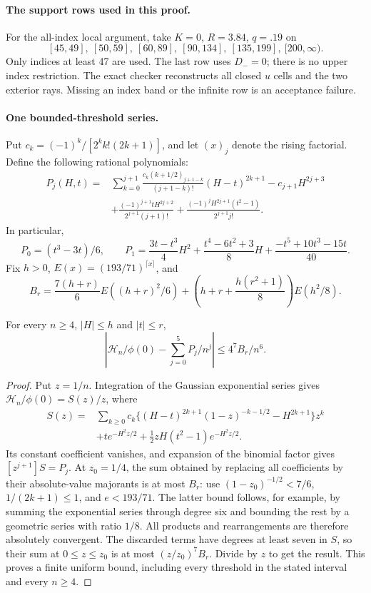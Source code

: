 \paragraph{The support rows used in this proof.}
For the all-index local argument, take $K=0$, $R=3.84$, $q=.19$ on
\[
[45,49],\ [50,59],\ [60,89],\ [90,134],\ [135,199],\ [200,\infty).
\]
Only indices at least 47 are used. The last row uses $D_-=0$;
there is no upper index restriction. The exact checker reconstructs
all closed $u$ cells and the two exterior rays. Missing an index band
or the infinite row is an acceptance failure.

\paragraph{One bounded-threshold series.}\label{j:local:support:series}
Put $c_k=(-1)^k/[2^kk!(2k+1)]$, and let $(x)_j$ denote the rising
factorial. Define the following rational polynomials:
\begin{align*}
 P_j(H,t)={}&\sum_{k=0}^{j+1}
 \frac{c_k(k+1/2)_{j+1-k}}{(j+1-k)!}(H-t)^{2k+1}
       -c_{j+1}H^{2j+3}\\
 &+\frac{(-1)^{j+1}tH^{2j+2}}{2^{j+1}(j+1)!}
       +\frac{(-1)^jH^{2j+1}(t^2-1)}{2^{j+1}j!}.
\end{align*}
In particular,
\[
 P_0=(t^3-3t)/6,\qquad
 P_1=\frac{3t-t^3}{4}H^2+\frac{t^4-6t^2+3}{8}H
                  +\frac{-t^5+10t^3-15t}{40}.
\]
Fix $h>0$, $E(x)=(193/71)^{\lceil x\rceil}$, and
\[
 B_r=\frac{7(h+r)}6E((h+r)^2/6)
       +\left(h+r+\frac{h(r^2+1)}8\right)E(h^2/8).
\]
\begin{lemma}\label{j:local:support:finite-series}
For every $n\ge4$, $|H|\le h$ and $|t|\le r$,
\[
 \left|\mathcal H_n/\phi(0)-\sum_{j=0}^5P_j/n^j\right|
       \le4^7B_r/n^6.
\]
\end{lemma}
\begin{proof}
Put $z=1/n$. Integration of the Gaussian exponential series gives
$\mathcal H_n/\phi(0)=S(z)/z$, where
\begin{align*}
 S(z)={}&\sum_{k\ge0}c_k\{(H-t)^{2k+1}(1-z)^{-k-1/2}
                                  -H^{2k+1}\}z^k\\
 &+te^{-H^2z/2}+\tfrac12zH(t^2-1)e^{-H^2z/2}.
\end{align*}
Its constant coefficient vanishes, and expansion of the binomial factor
gives $[z^{j+1}]S=P_j$. At $z_0=1/4$, the sum obtained by replacing
all coefficients by their absolute-value majorants is at most $B_r$:
use $(1-z_0)^{-1/2}<7/6$, $1/(2k+1)\le1$, and $e<193/71$.
The latter bound follows, for example, by summing the exponential series
through degree six and bounding the rest by a geometric series with
ratio $1/8$. All products and rearrangements are therefore absolutely
convergent. The discarded terms have degrees at least seven in $S$,
so their sum at $0\le z\le z_0$ is at most $(z/z_0)^7B_r$.
Divide by $z$ to get the result. This proves a finite uniform bound,
including every threshold in the stated interval and every $n\ge4$.
\end{proof}

